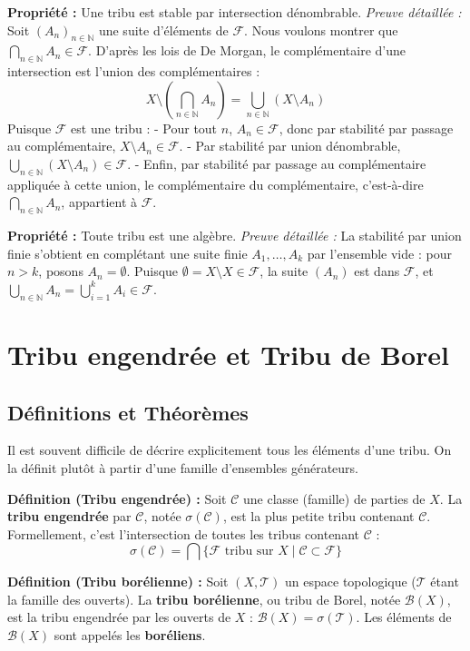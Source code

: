 \documentclass[11pt,a4paper]{article}
\begin{document}
\textbf{Propriété :} Une tribu est stable par intersection dénombrable.
\textit{Preuve détaillée :} Soit $(A_n)_{n \in \mathbb{N}}$ une suite d'éléments de $\mathcal{F}$. Nous voulons montrer que $\bigcap_{n \in \mathbb{N}} A_n \in \mathcal{F}$.
D'après les lois de De Morgan, le complémentaire d'une intersection est l'union des complémentaires :
$$ X \setminus \left( \bigcap_{n \in \mathbb{N}} A_n \right) = \bigcup_{n \in \mathbb{N}} (X \setminus A_n) $$
Puisque $\mathcal{F}$ est une tribu :
- Pour tout $n$, $A_n \in \mathcal{F}$, donc par stabilité par passage au complémentaire, $X \setminus A_n \in \mathcal{F}$.
- Par stabilité par union dénombrable, $\bigcup_{n \in \mathbb{N}} (X \setminus A_n) \in \mathcal{F}$.
- Enfin, par stabilité par passage au complémentaire appliquée à cette union, le complémentaire du complémentaire, c'est-à-dire $\bigcap_{n \in \mathbb{N}} A_n$, appartient à $\mathcal{F}$.

\textbf{Propriété :} Toute tribu est une algèbre.
\textit{Preuve détaillée :} La stabilité par union finie s'obtient en complétant une suite finie $A_1, \dots, A_k$ par l'ensemble vide : pour $n > k$, posons $A_n = \emptyset$. Puisque $\emptyset = X \setminus X \in \mathcal{F}$, la suite $(A_n)$ est dans $\mathcal{F}$, et $\bigcup_{n \in \mathbb{N}} A_n = \bigcup_{i=1}^k A_i \in \mathcal{F}$.

\section{Tribu engendrée et Tribu de Borel}

\subsection{Définitions et Théorèmes}

Il est souvent difficile de décrire explicitement tous les éléments d'une tribu. On la définit plutôt à partir d'une famille d'ensembles générateurs.

\textbf{Définition (Tribu engendrée) :}
Soit $\mathcal{C}$ une classe (famille) de parties de $X$. La \textbf{tribu engendrée} par $\mathcal{C}$, notée $\sigma(\mathcal{C})$, est la plus petite tribu contenant $\mathcal{C}$. Formellement, c'est l'intersection de toutes les tribus contenant $\mathcal{C}$ :
$$ \sigma(\mathcal{C}) = \bigcap \{ \mathcal{F} \text{ tribu sur } X \mid \mathcal{C} \subset \mathcal{F} \} $$

\textbf{Définition (Tribu borélienne) :}
Soit $(X, \mathcal{T})$ un espace topologique ($\mathcal{T}$ étant la famille des ouverts). La \textbf{tribu borélienne}, ou tribu de Borel, notée $\mathcal{B}(X)$, est la tribu engendrée par les ouverts de $X$ : $\mathcal{B}(X) = \sigma(\mathcal{T})$.
Les éléments de $\mathcal{B}(X)$ sont appelés les \textbf{boréliens}.
\end{document}
